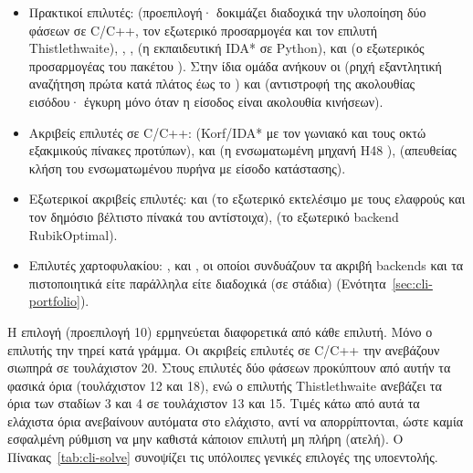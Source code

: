 \begin{itemize}
\item Πρακτικοί επιλυτές:  (προεπιλογή· δοκιμάζει διαδοχικά την υλοποίηση δύο φάσεων σε C/C++, τον εξωτερικό προσαρμογέα και τον επιλυτή Thistlethwaite), , ,  (η εκπαιδευτική IDA* σε Python),  και  (ο εξωτερικός προσαρμογέας του πακέτου  \cite{muodovKociembaPkg}). Στην ίδια ομάδα ανήκουν οι  (ρηχή εξαντλητική αναζήτηση πρώτα κατά πλάτος έως το ) και  (αντιστροφή της ακολουθίας εισόδου· έγκυρη μόνο όταν η είσοδος είναι ακολουθία κινήσεων).
\item Ακριβείς επιλυτές σε C/C++:  (Korf/IDA* με τον γωνιακό και τους οκτώ εξακμικούς πίνακες προτύπων),  και  (η ενσωματωμένη μηχανή H48 \cite{trontoNissyCoreH48}),  (απευθείας κλήση του ενσωματωμένου πυρήνα με είσοδο κατάστασης).
\item Εξωτερικοί ακριβείς επιλυτές:  και  (το εξωτερικό εκτελέσιμο  με τους ελαφρούς και τον δημόσιο βέλτιστο πίνακά του αντίστοιχα),  (το εξωτερικό backend RubikOptimal).
\item Επιλυτές χαρτοφυλακίου: ,  και , οι οποίοι συνδυάζουν τα ακριβή backends και τα πιστοποιητικά είτε παράλληλα είτε διαδοχικά (σε στάδια) (Ενότητα~\ref{sec:cli-portfolio}).
\end{itemize}

Η επιλογή  (προεπιλογή 10) ερμηνεύεται διαφορετικά από κάθε επιλυτή. Μόνο ο επιλυτής  την τηρεί κατά γράμμα. Οι ακριβείς επιλυτές σε C/C++ την ανεβάζουν σιωπηρά σε τουλάχιστον 20. Στους επιλυτές δύο φάσεων προκύπτουν από αυτήν τα φασικά όρια (τουλάχιστον 12 και 18), ενώ ο επιλυτής Thistlethwaite ανεβάζει τα όρια των σταδίων 3 και 4 σε τουλάχιστον 13 και 15. Τιμές κάτω από αυτά τα ελάχιστα όρια ανεβαίνουν αυτόματα στο ελάχιστο, αντί να απορρίπτονται, ώστε καμία εσφαλμένη ρύθμιση να μην καθιστά κάποιον επιλυτή μη πλήρη (ατελή). Ο Πίνακας~\ref{tab:cli-solve} συνοψίζει τις υπόλοιπες γενικές επιλογές της υποεντολής.

